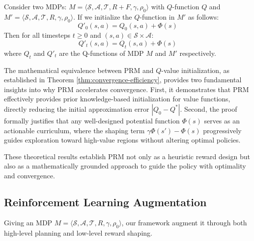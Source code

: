 \begin{theorem}\label{thm:convergence-efficiency}
Consider two MDPs: \( M = \langle \mathcal{S}, \mathcal{A}, \mathcal{T}, R+F, \gamma, \rho_0 \rangle \) with $Q$-function $Q$ and \( M' = \langle \mathcal{S}, \mathcal{A}, \mathcal{T}, R, \gamma, \rho_0 \rangle \). If we initialize the $Q$-function in $M'$ as follows:
\begin{equation*}
    Q'_0(s, a) = Q_0(s, a) + \Phi(s)
\end{equation*}
Then for all timesteps $t \geq 0$ and $(s,a) \in \mathcal{S} \times \mathcal{A}$:
\begin{equation*}
    Q'_t(s,a) = Q_t(s,a) + \Phi(s)
\end{equation*}
where $Q_t$ and $Q'_t$ are the Q-functions of MDP $M$ and $M'$ respectively.
\end{theorem}
The mathematical equivalence between PRM and $Q$-value initialization, as established in Theorem \ref{thm:convergence-efficiency}, provides two fundamental insights into why PRM accelerates convergence.
First, it demonstrates that PRM effectively provides prior knowledge-based initialization for value functions, directly reducing the initial approximation error $| Q_0 - Q^* |$.
Second, the proof formally justifies that any well-designed potential function $\Phi(s)$ serves as an actionable curriculum, where the shaping term $\gamma \Phi(s') - \Phi(s)$ progressively guides exploration toward high-value regions without altering optimal policies.

These theoretical results establish PRM not only as a heuristic reward design but also as a mathematically grounded approach to guide the policy with optimality and convergence.

\subsection{Reinforcement Learning Augmentation}\label{sec:rl-augmentation}
Giving an MDP  \( M = \langle \mathcal{S}, \mathcal{A}, \mathcal{T}, R, \gamma, \rho_0 \rangle \), our framework augment it through both high-level planning and low-level reward shaping.

